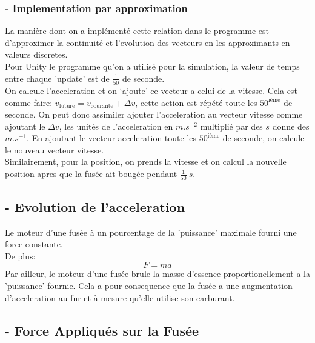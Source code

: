 \documentclass[a4paper, 12pt]{scrartcl}
\begin{document}
\subsubsection{- Implementation par approximation}
La manière dont on a implémenté cette relation dans le programme est d'approximer la 
continuité et l'evolution des vecteurs en les approximants en valeurs discretes. 
\\
Pour Unity le programme qu'on a utilisé pour la simulation, la valeur de temps entre chaque 'update' est de $\frac{1}{50}$ de seconde. 
\\
On calcule l'acceleration et on `ajoute' ce vecteur a celui de la vitesse. Cela est comme faire: $v_{\text{future}} = v_{\text{courante}} + \Delta v$, cette action est répété
toute les $50^{\text{ième}}$ de seconde. On peut donc assimiler ajouter l'acceleration au vecteur vitesse comme ajoutant le $\Delta v$, 
les unités de l'acceleration en $\si{m.s^{-2}}$ multiplié par des $\si{s}$ donne des $\si{m.s^{-1}}$. En ajoutant le vecteur acceleration toute les $50^{\text{ième}}$ de seconde, 
on calcule le nouveau vecteur vitesse. 
\\
Similairement, pour la position, on prends la vitesse et on calcul la nouvelle position apres que la fusée
ait bougée pendant $\frac{1}{50}\ \si{s}$.

\subsection{- Evolution de l'acceleration}
Le moteur d'une fusée à un pourcentage de la 'puissance' maximale fourni une force
constante. 
\\
De plus:
\[F = ma \]
Par ailleur, le moteur d'une fusée brule la masse d'essence proportionellement a la 'puissance' fournie.
Cela a pour consequence que la fusée a une augmentation d'acceleration au fur et 
à mesure qu'elle utilise son carburant. 

\subsection{- Force Appliqués sur la Fusée}
\end{document}

